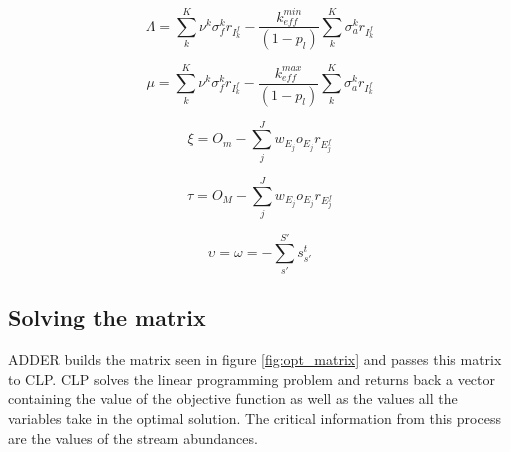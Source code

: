 \documentclass[]{elsarticle}
\begin{document}
\begin{equation}
\label{eq:Lambda_bound}
\Lambda = \sum \limits_{k}^{K} \nu^{k} \sigma_{f}^{k} r_{I_{k}^{f}} -
    \frac{k_{eff}^{min}}{(1 - p_{l})} \sum \limits_{k}^{K} \sigma_{a}^{k}
    r_{I_{k}^{f}}
\end{equation}

\begin{equation}
\label{eq:mu_bound}
\mu = \sum \limits_{k}^{K} \nu^{k} \sigma_{f}^{k} r_{I_{k}^{f}} -
    \frac{k_{eff}^{max}}{(1 - p_{l})} \sum \limits_{k}^{K} \sigma_{a}^{k}
    r_{I_{k}^{f}}
\end{equation}

\begin{equation}
\label{eq:xi_bound}
\xi = O_{m} - \sum \limits_{j}^{J} w_{E_{j}} o_{E_{j}} r_{E_{j}^{f}}
\end{equation}

\begin{equation}
\label{eq:tau_bound}
\tau = O_{M} - \sum \limits_{j}^{J} w_{E_{j}} o_{E_{j}} r_{E_{j}^{f}}
\end{equation}

\begin{equation}
\label{eq:upsilon_bound}
\upsilon = \omega = -\sum \limits_{s'}^{S'} s_{s'}^{t}
\end{equation}

\subsection{Solving the matrix} \label{ssec:solving}
ADDER builds the matrix seen in figure \ref{fig:opt_matrix} and passes this
matrix to CLP. CLP solves the linear programming problem and returns back a
vector containing the value of the objective function as well as the values
all the variables take in the optimal solution. The critical information from
this process are the values of the stream abundances.
\end{document}
